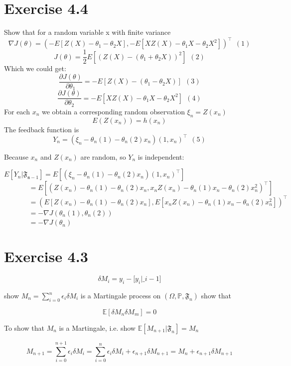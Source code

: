 \documentclass{article}
\begin{document}
\section{Exercise 4.4}

Show that  for a random variable x with finite variance
$$ \nabla J(\theta) = (-E[Z(X)-\theta_1-\theta_2X], -E[XZ(X)-\theta_1X-\theta_2X^2])^\intercal  \ \ (1) $$
$$J(\theta) = \frac{1}{2}E[(Z(X)-(\theta_1+\theta_2X))^2] \ \ (2)$$
Which we could get:
$$\frac{\partial J(\theta)}{\partial \theta_1} = -E[Z(X)-(\theta_1-\theta_2X)] \ \ (3) $$
$$\frac{\partial J(\theta)}{\partial \theta_2} = -E[XZ(X)-\theta_1X-\theta_2X^2]  \ \ (4)$$
For each $x_n$ we obtain a corresponding random observation $ \xi_n=Z(x_n)$ \\
$$ E(Z(x_n)) = h(x_n) $$
The feedback function is 
 $$ Y_n = (\xi_n-\theta_n(1)-\theta_n(2)x_n)(1,x_n)^\intercal \ \ (5)$$
 
Because $x_n$ and $Z(x_n)$ are random, so $Y_n$ is independent:
\begin{flushleft}
$ E[Y_n|\mathfrak{F_{n-1}}] = E[(\xi_n-\theta_n(1)-\theta_n(2)x_n)(1,x_n)^\intercal] $  \\
$ \ \ \ \ \ \ \ \ \ \ \ \ \ \ \ \ =E[(Z(x_n)-\theta_n(1)-\theta_n(2)x_n, x_nZ(x_n)-\theta_n(1)x_n-\theta_n(2)x_n^2)^\intercal] $  \\
$ \ \ \ \ \ \ \ \ \ \ \ \ \ \ \ \ =(E[Z(x_n)-\theta_n(1)-\theta_n(2)x_n], E[x_nZ(x_n)-\theta_n(1)x_n-\theta_n(2)x_n^2])^\intercal $  \\
$ \ \ \ \ \ \ \ \ \ \ \ \ \ \ \ \ =-\nabla J(\theta_n(1),\theta_n(2)) $  \\
$ \ \ \ \ \ \ \ \ \ \ \ \ \ \ \ \ =-\nabla J(\theta_n) $
\end{flushleft} 


\section{Exercise 4.3}

$$\delta M_i = y_i - \mathbb[y_i | \mathfrak_{i-1}]$$

show $M_n = \sum_{i=0}^{n}\epsilon_i\delta M_i$ is a Martingale process on $(\Omega,\mathbb{P}, \mathfrak{F}_{n})$ show that 

$$\mathbb{E}[\delta M_n \delta M_m] = 0$$

To show that $M_n$ is a Martingale, i.e. show $\mathbb{E}[M_{n+1}|\mathfrak{F}_{n}] = M_n$

$$M_{n+1} = \sum_{i=0}^{n+1}\epsilon_{i}\delta M_{i} = \sum_{i=0}^{n}\epsilon_{i}\delta M_{i} + \epsilon_{n+1}\delta M_{n+1} = M_{n} + \epsilon_{n+1}\delta M_{n+1}$$
\end{document}
